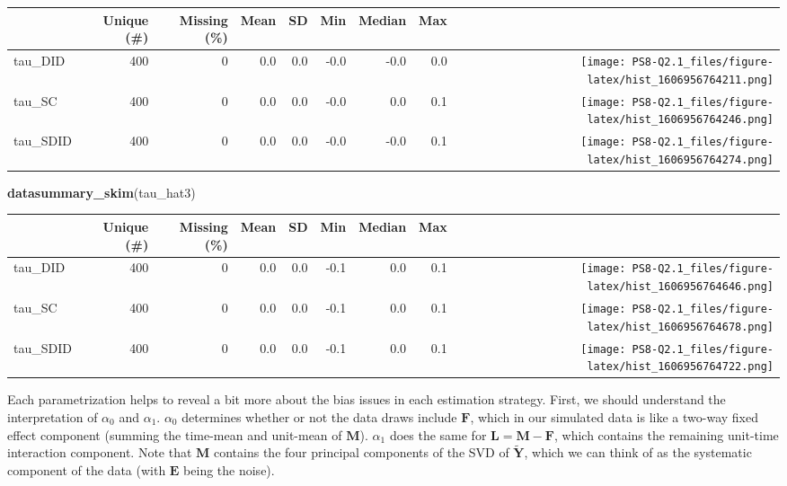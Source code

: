\documentclass[
]{article}
\newenvironment{Shaded}{\begin{snugshade}}{\end{snugshade}}
\newcommand{\KeywordTok}[1]{\textcolor[rgb]{0.13,0.29,0.53}{\textbf{#1}}}
\newcommand{\NormalTok}[1]{#1}
\begin{document}
\begin{table}[H]
\centering
\begin{tabular}[t]{lrrrrrrr>{}r}
\toprule
  & Unique (\#) & Missing (\%) & Mean & SD & Min & Median & Max &   \\
\midrule
tau\_DID & 400 & 0 & 0.0 & 0.0 & -0.0 & -0.0 & 0.0 & \texttt{[image: PS8-Q2.1\_files/figure-latex/hist\_1606956764211.png]}\\
tau\_SC & 400 & 0 & 0.0 & 0.0 & -0.0 & 0.0 & 0.1 & \texttt{[image: PS8-Q2.1\_files/figure-latex/hist\_1606956764246.png]}\\
tau\_SDID & 400 & 0 & 0.0 & 0.0 & -0.0 & -0.0 & 0.1 & \texttt{[image: PS8-Q2.1\_files/figure-latex/hist\_1606956764274.png]}\\
\bottomrule
\end{tabular}
\end{table}

\begin{Shaded}
\begin{Highlighting}[]
\KeywordTok{datasummary_skim}\NormalTok{(tau_hat3)}
\end{Highlighting}
\end{Shaded}

\begin{table}[H]
\centering
\begin{tabular}[t]{lrrrrrrr>{}r}
\toprule
  & Unique (\#) & Missing (\%) & Mean & SD & Min & Median & Max &   \\
\midrule
tau\_DID & 400 & 0 & 0.0 & 0.0 & -0.1 & 0.0 & 0.1 & \texttt{[image: PS8-Q2.1\_files/figure-latex/hist\_1606956764646.png]}\\
tau\_SC & 400 & 0 & 0.0 & 0.0 & -0.1 & 0.0 & 0.1 & \texttt{[image: PS8-Q2.1\_files/figure-latex/hist\_1606956764678.png]}\\
tau\_SDID & 400 & 0 & 0.0 & 0.0 & -0.1 & 0.0 & 0.1 & \texttt{[image: PS8-Q2.1\_files/figure-latex/hist\_1606956764722.png]}\\
\bottomrule
\end{tabular}
\end{table}

Each parametrization helps to reveal a bit more about the bias issues in
each estimation strategy. First, we should understand the interpretation
of \(\alpha_0\) and \(\alpha_1\). \(\alpha_0\) determines whether or not
the data draws include \(\textbf{F}\), which in our simulated data is
like a two-way fixed effect component (summing the time-mean and
unit-mean of \(\textbf{M}\)). \(\alpha_1\) does the same for
\(\textbf{L}=\textbf{M}-\textbf{F}\), which contains the remaining
unit-time interaction component. Note that \(\textbf{M}\) contains the
four principal components of the SVD of \(\tilde{\textbf{Y}}\), which we
can think of as the systematic component of the data (with
\(\textbf{E}\) being the noise).
\end{document}

